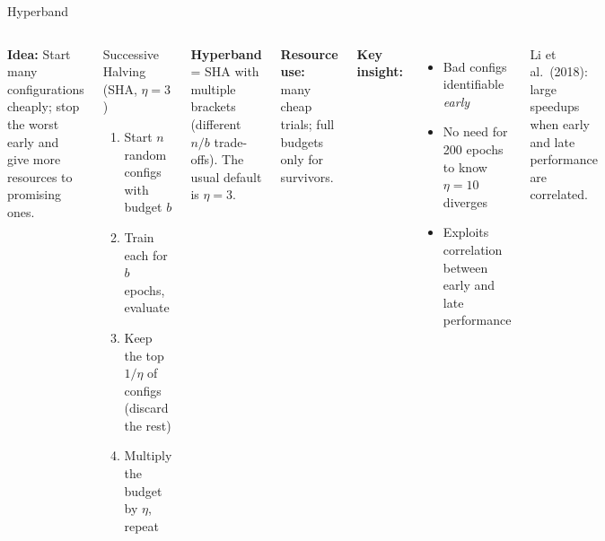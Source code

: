 \documentclass[aspectratio=169,11pt]{beamer}
\newcommand{\emphc}[1]{\textcolor{harvardcrimson}{#1}}
\begin{document}
\begin{frame}{Hyperband}
\footnotesize
\begin{columns}[T]
\textbf{Idea:} Start many configurations cheaply; \emphc{stop the worst early} and give more resources to promising ones.

\vspace{0.05cm}
\begin{block}{Successive Halving (SHA, $\eta=3$)}
\begin{enumerate}\itemsep0pt
    \item Start $n$ random configs with budget $b$
    \item Train each for $b$ epochs, evaluate
    \item \emphc{Keep the top $1/\eta$} of configs (discard the rest)
    \item Multiply the budget by $\eta$, repeat
\end{enumerate}
\end{block}

\textbf{Hyperband} = SHA with multiple brackets (different $n/b$ trade-offs).  The usual default is $\eta=3$.

\textbf{Resource use:} many cheap trials; full budgets only for survivors.

\textbf{Key insight:}
\begin{itemize}\itemsep0pt
    \item Bad configs identifiable \emph{early}
    \item No need for 200 epochs to know $\eta\!=\!10$ diverges
    \item Exploits \emphc{correlation} between early and late performance
\end{itemize}

{\scriptsize Li et al.\ (2018): large speedups when early and late performance are correlated.}
\end{columns}
\end{frame}
\end{document}
